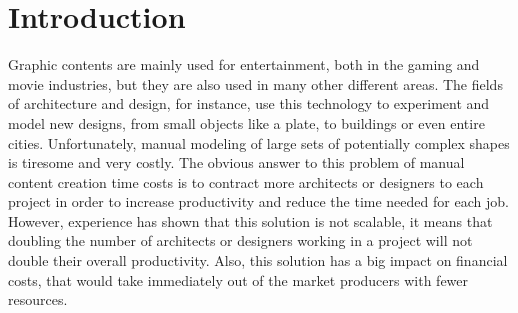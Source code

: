 
% 
% 

\section{Introduction}




Graphic contents are mainly used for entertainment, both in the gaming and movie industries, but they are also used in many other different areas. The fields of architecture and design, for instance, use this technology to experiment and model new designs, from small objects like a plate, to buildings or even entire cities. Unfortunately, manual modeling of large sets of potentially complex shapes is tiresome and very costly. 
The obvious answer to this problem of manual content creation time costs is to contract more architects or designers to each project in order to increase productivity and reduce the time needed for each job. However, experience has shown that this solution is not scalable, it means that doubling the number of architects or designers working in a project will not double their overall productivity. Also, this solution has a big impact on financial costs, that would take immediately out of the market producers with fewer resources.

